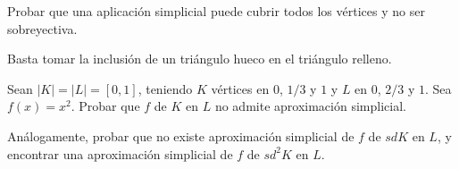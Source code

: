 \documentclass[twoside]{article}
\begin{document}
\newpage

\begin{ejercicio}{1.16}
Probar que una aplicación simplicial puede cubrir todos los vértices y no ser sobreyectiva.
\end{ejercicio}
\begin{solucion}
Basta tomar la inclusión de un triángulo hueco en el triángulo relleno.
\end{solucion}

\newpage

\begin{ejercicio}{1.17}
Sean $|K| = |L| = [0,1]$, teniendo $K$ vértices en $0$, $1/3$ y $1$ y $L$ en $0$, $2/3$ y $1$.
Sea $f(x) = x^2$. Probar que $f$ de $K$ en $L$ no admite aproximación simplicial.

Análogamente, probar que no existe aproximación simplicial de $f$ de $sd K$ en $L$, y encontrar una aproximación simplicial de $f$ de $sd^2 K$ en $L$.
\end{ejercicio}
\begin{solucion}
\end{solucion}
\end{document}
